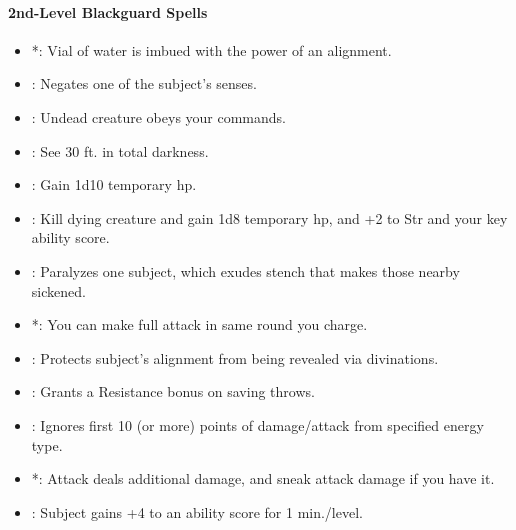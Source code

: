 \paragraph{2nd-Level Blackguard Spells}
\begin{itemize}
\item {}*: Vial of water is imbued with the power of an alignment.
\item {}: Negates one of the subject's senses. %
\item {}: Undead creature obeys your commands. %
\item {}: See 30 ft. in total darkness. %
\item {}: Gain 1d10 temporary hp. %
\item {}: Kill dying creature and gain 1d8 temporary hp, and +2 to Str and your key ability score. %
\item {}: Paralyzes one subject, which exudes stench that makes those nearby sickened. %
\item {}*: You can make full attack in same round you charge.
\item {}: Protects subject's alignment from being revealed via divinations.
\item {}: Grants a Resistance bonus on saving throws.
\item {}: Ignores first 10 (or more) points of damage/attack from specified energy type.
\item {}*: Attack deals additional damage, and sneak attack damage if you have it. %
\item {}: Subject gains +4 to an ability score for 1 min./level.
\end{itemize}
